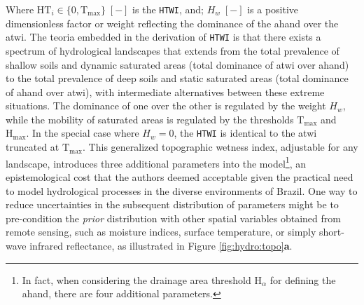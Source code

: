 \documentclass[./main_en.tex]{subfiles}
\begin{document}
Where $\text{HT}_{i}\in \{0,\text{T}_\text{max}\}\;[-]$ is the \texttt{HTWI}, and; $H_w\;[-]$ is a positive dimensionless factor or weight reflecting the dominance of the \acrshort{ahand} over the \acrshort{atwi}. The \gls{teoria} embedded in the derivation of \texttt{HTWI} is that there exists a spectrum of hydrological landscapes that extends from the total prevalence of shallow soils and dynamic saturated areas (total dominance of \acrshort{atwi} over \acrshort{ahand}) to the total prevalence of deep soils and static saturated areas (total dominance of \acrshort{ahand} over \acrshort{atwi}), with intermediate alternatives between these extreme situations. The dominance of one over the other is regulated by the weight $H_w$, while the mobility of saturated areas is regulated by the thresholds $\text{T}_\text{max}$ and $\text{H}_\text{max}$. In the special case where $H_w = 0$, the \texttt{HTWI} is identical to the \acrshort{atwi} truncated at $\text{T}_\text{max}$. This generalized topographic wetness index, adjustable for any landscape, introduces three additional \gls{parameters} into the model\footnote{In fact, when considering the drainage area threshold $\text{H}_{\alpha}$ for defining the \acrshort{ahand}, there are four additional \gls{parameters}.}, an epistemological cost that the authors deemed acceptable given the practical need to model hydrological processes in the diverse environments of Brazil. One way to reduce uncertainties in the subsequent distribution of \gls{parameters} might be to pre-condition the \textit{prior} distribution with other spatial variables obtained from remote sensing, such as moisture indices, surface temperature, or simply short-wave infrared reflectance, as illustrated in Figure \ref{fig:hydro:topo}\textbf{a}.
\end{document}
